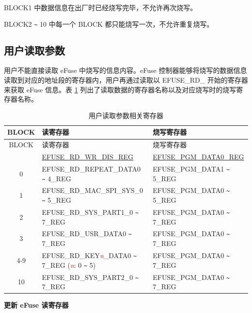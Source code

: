 \documentclass[main\_\_CN.tex]{subfiles}
\begin{document}
BLOCK1 中数据信息在出厂时已经烧写完毕，不允许再次烧写。

BLOCK2 \verb+~+ 10 中每一个 BLOCK 都只能烧写一次，不允许重复烧写。


\subsection{用户读取参数}\label{softwarereadparameters}

用户不能直接读取 eFuse 中烧写的信息内容。eFuse 控制器能够将烧写的数据信息读取到对应的地址段的寄存器内，用户再通过读取以 EFUSE\_RD\_ 开始的寄存器来获取 eFuse 信息。表 \ref{fig:efuse-read-register} 列出了读取数据的寄存器名称以及对应烧写时的烧写寄存器名称。


\begin{longtable}[c]{|c|l|l|}
    \caption{用户读取参数相关寄存器} \label{fig:efuse-read-register}
    \\\hline
    \rowcolor{lightgray}
  BLOCK & 读寄存器 & 烧写寄存器\\
    \endfirsthead
    \hline
    \rowcolor{lightgray}
  BLOCK & 读寄存器 & 烧写寄存器\\
    \endhead
    \endfoot
    \endlastfoot
    \hline
0 & \hyperref[regdesc:EFUSERDWRDISREG]{EFUSE\_RD\_WR\_DIS\_REG} & \hyperref[regdesc:EFUSEPGMDATANREG]{EFUSE\_PGM\_DATA0\_REG} \\\hline
0 & EFUSE\_RD\_REPEAT\_DATA0 \verb+~+ 4\_REG & EFUSE\_PGM\_DATA1 \verb+~+ 5\_REG \\\hline
1 & EFUSE\_RD\_MAC\_SPI\_SYS\_0 \verb+~+ 5\_REG & EFUSE\_PGM\_DATA0 \verb+~+ 5\_REG \\\hline
2 & EFUSE\_RD\_SYS\_PART1\_0 \verb+~+ 7\_REG & EFUSE\_PGM\_DATA0 \verb+~+ 7\_REG \\\hline
3 & EFUSE\_RD\_USR\_DATA0 \verb+~+ 7\_REG & EFUSE\_PGM\_DATA0 \verb+~+ 7\_REG \\ \hline
4-9 & EFUSE\_RD\_KEY\textcolor{red}{\it{n}}\_DATA0 \verb+~+ 7\_REG (\textcolor{red}{\it{n}}: 0 \verb+~+ 5) & EFUSE\_PGM\_DATA0 \verb+~+ 7\_REG \\\hline
10 & EFUSE\_RD\_SYS\_PART2\_0 \verb+~+ 7\_REG & EFUSE\_PGM\_DATA0 \verb+~+ 7\_REG \\\hline
\end{longtable}

{\bfseries 更新 eFuse 读寄存器}\label{updatingRDregister}
\end{document}
